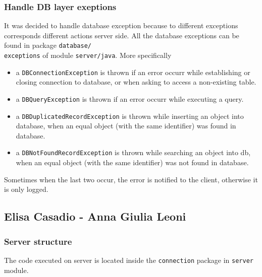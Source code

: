 \documentclass[a4paper,12pt]{report}
\begin{document}
\subsubsection{Handle DB layer exeptions}
It was decided to handle database exception because to different exceptions corresponds different actions server side. All the database exceptions can be found in package \texttt{database/\\exceptions} of module \texttt{server/java}. More specifically
\begin{itemize}
\item a \texttt{DBConnectionException} is thrown if an error occurr while establishing or closing connection to database, or when asking to access a non-existing table.
\item a \texttt{DBQueryException} is thrown if an error occurr while executing a query.
\item a \texttt{DBDuplicatedRecordException} is thrown while inserting an object into database, when an equal object (with the same identifier) was found in database.
\item a \texttt{DBNotFoundRecordException} is thrown while searching an object into db, when an equal object (with the same identifier) was not found in database.
\end{itemize}
Sometimes when the last two occur, the error is notified to the client, otherwise it is only logged.

\subsection{Elisa Casadio - Anna Giulia Leoni}
\subsubsection{Server structure}
The code executed on server is located inside the \texttt{connection} package in \texttt{server} module.
\end{document}
